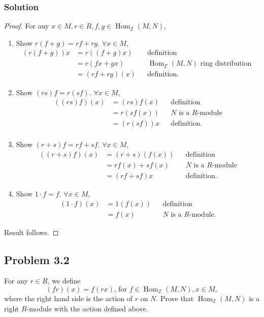 \documentclass{article}
\theoremstyle{plain}
\newcommand{\Z}{\mathbb{Z}}
\DeclareMathOperator{\Hom}{Hom}
\begin{document}
\subsubsection*{Solution}
\begin{proof}
          For any $x\in M, r\in R, f,g\in\Hom_{\Z}(M,N)$,
  \begin{enumerate}
    \item Show $r(f+g)=rf+rg$. $\forall x\in M$,
          \begin{align*}
            (r(f+g))x&=r((f+g)x)&&\text{definition}\\
                     &=r(fx+gx)&&\Hom_{\Z}(M,N)\text{ ring distribution }\\
                     &=(rf+rg)(x) &&\text{definition}.
        \end{align*}
    \item Show $(rs)f=r(sf)$. $\forall x\in M$,
          \begin{align*}
            ((rs)f)(x)&=(rs)f(x)&&\text{definition}\\
                      &=r(sf(x))&&N\text{ is a }R\text{-module}\\
                      &=(r(sf))x&&\text{definition}.\\
          \end{align*}
    \item Show $(r+s)f=rf+sf$. $\forall x\in M$,
          \begin{align*}
            ((r+s)f)(x)&=(r+s)(f(x))&&\text{definition}\\
                      &=rf(x)+sf(x)&&N\text{ is a }R\text{-module}\\
                      &=(rf+sf)x&&\text{definition}.
          \end{align*}
    \item Show $1\cdot f=f$. $\forall x\in M$,
          \begin{align*}
            (1\cdot f)(x)&=1(f(x))&&\text{definition}\\
                      &=f(x)&&\text{$N$ is a $R$-module}.
          \end{align*}
\end{enumerate}
Result follows.
\end{proof}
\subsection*{Problem 3.2}
For any $r\in R$, we define \[(fr)(x)=f(rx)\text{, for }f\in\Hom_{\Z}(M,N),x\in M,\]
where the right hand side is the action of $r$ on $N$. Prove that
$\Hom_{\Z}(M, N)$ is a right $R$-module with the action defined above.
\end{document}

